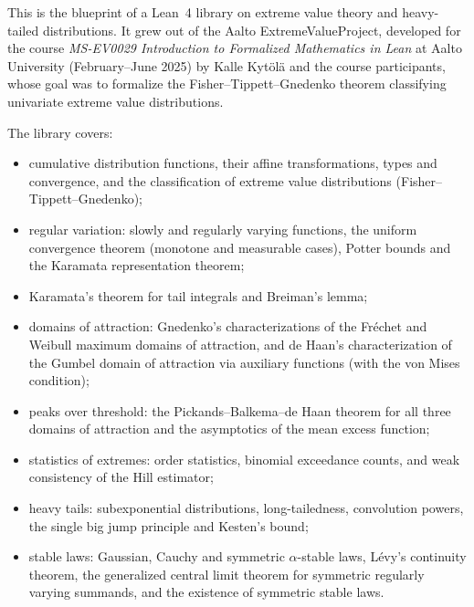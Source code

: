 %

This is the blueprint of a Lean~4 library on extreme value theory and heavy-tailed
distributions. It grew out of the Aalto ExtremeValueProject, developed for the course
\emph{MS-EV0029 Introduction to Formalized Mathematics in Lean}
at Aalto University (February--June 2025) by Kalle Kytölä and the course participants,
whose goal was to formalize the Fisher--Tippett--Gnedenko theorem
classifying univariate extreme value distributions.

The library covers:
\begin{itemize}
  \item cumulative distribution functions, their affine transformations, types and
    convergence, and the classification of extreme value distributions
    (Fisher--Tippett--Gnedenko);
  \item regular variation: slowly and regularly varying functions, the uniform convergence
    theorem (monotone and measurable cases), Potter bounds and the Karamata representation
    theorem;
  \item Karamata's theorem for tail integrals and Breiman's lemma;
  \item domains of attraction: Gnedenko's characterizations of the Fréchet and Weibull
    maximum domains of attraction, and de Haan's characterization of the Gumbel domain of
    attraction via auxiliary functions (with the von Mises condition);
  \item peaks over threshold: the Pickands--Balkema--de Haan theorem for all three domains of
    attraction and the asymptotics of the mean excess function;
  \item statistics of extremes: order statistics, binomial exceedance counts, and weak
    consistency of the Hill estimator;
  \item heavy tails: subexponential distributions, long-tailedness, convolution powers,
    the single big jump principle and Kesten's bound;
  \item stable laws: Gaussian, Cauchy and symmetric $\alpha$-stable laws, Lévy's continuity
    theorem, the generalized central limit theorem for symmetric regularly varying summands,
    and the existence of symmetric stable laws.
\end{itemize}

